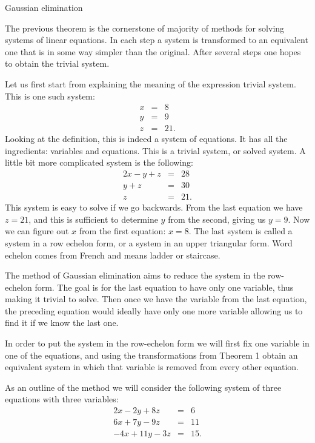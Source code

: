 Gaussian elimination

The previous theorem is the cornerstone of majority of methods for solving systems of linear equations. In each step a system is transformed to an equivalent one that is in some way simpler than the original. After several steps one hopes to obtain the trivial system.

Let us first start from explaining the meaning of the expression trivial system. This is one such system: \begin{eqnarray*} x&=&8\\ y&=&9\\ z&=&21.\end{eqnarray*} Looking at the definition, this is indeed a system of equations. It has all the ingredients: variables and equations. This is a trivial system, or solved system. A little bit more complicated system is the following: \begin{eqnarray*} 2x-y+z&=&28\\ y+z&=&30\\ z&=&21. \end{eqnarray*} This system is easy to solve if we go backwards. From the last equation we have \( z=21 \), and this is sufficient to determine \( y \) from the second, giving us \( y=9 \). Now we can figure out \( x \) from the first equation: \( x=8 \). The last system is called a system in a row echelon form, or a system in an upper triangular form. Word echelon comes from French and means ladder or staircase.

The method of Gaussian elimination aims to reduce the system in the row-echelon form. The goal is for the last equation to have only one variable, thus making it trivial to solve. Then once we have the variable from the last equation, the preceding equation would ideally have only one more variable allowing us to find it if we know the last one.

In order to put the system in the row-echelon form we will first fix one variable in one of the equations, and using the transformations from Theorem 1 obtain an equivalent system in which that variable is removed from every other equation.

As an outline of the method we will consider the following system of three equations with three variables: \begin{eqnarray*} 2x-2y+8z&=&6\\ 6x+7y-9z&=&11\\ -4x+11y-3z&=&15. \end{eqnarray*}

